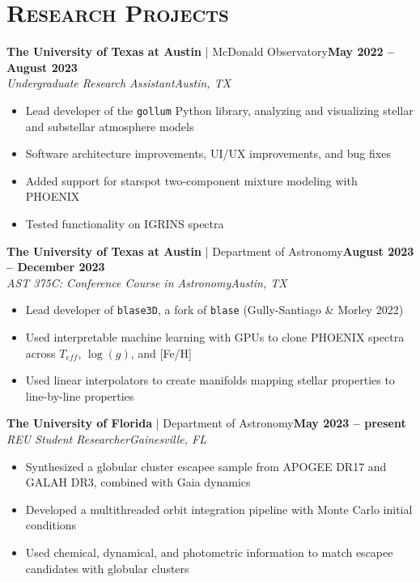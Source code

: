 \documentclass[11pt]{article}
\begin{document}
\section{\textsc{Research Projects}}
\normalsize\textbf{The University of Texas at Austin} | McDonald Observatory\hfill\small\textbf{May 2022 -- August 2023}
\\ \textit{Undergraduate Research Assistant\hfill Austin, TX} \vspace{-15pt}
\\ \begin{itemize}[itemsep=-3pt, parsep=3pt, label={--}]
    \item Lead developer of the \texttt{gollum} Python library, analyzing and visualizing stellar and substellar atmosphere models
    \item Software architecture improvements, UI/UX improvements, and bug fixes
    \item Added support for starspot two-component mixture modeling with PHOENIX
    \item Tested functionality on IGRINS spectra
\end{itemize}
\normalsize\textbf{The University of Texas at Austin} | Department of Astronomy\hfill\small\textbf{August 2023 -- December 2023}
\\ \textit{AST 375C: Conference Course in Astronomy\hfill Austin, TX} \vspace{-15pt}
\\ \begin{itemize}[itemsep=-3pt, parsep=3pt, label={--}]
    \item Lead developer of \texttt{blase3D}, a fork of \texttt{blase} (Gully-Santiago \& Morley 2022)
    \item Used interpretable machine learning with GPUs to clone PHOENIX spectra across $T_{eff}$, $\log{(g)}$, and [Fe/H]
    \item Used linear interpolators to create manifolds mapping stellar properties to line-by-line properties
\end{itemize}
\normalsize\textbf{The University of Florida} | Department of Astronomy\hfill\small\textbf{May 2023 -- present}
\\ \textit{REU Student Researcher\hfill Gainesville, FL} \vspace{-15pt}
\\ \begin{itemize}[itemsep=-3pt, parsep=3pt, label={--}]
    \item Synthesized a globular cluster escapee sample from APOGEE DR17 and GALAH DR3, combined with Gaia dynamics
    \item Developed a multithreaded orbit integration pipeline with Monte Carlo initial conditions
    \item Used chemical, dynamical, and photometric information to match escapee candidates with globular clusters
\end{itemize}
\end{document}
